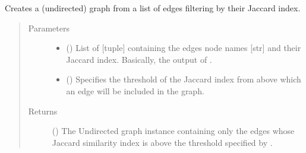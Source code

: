 \documentclass[letterpaper,10pt,english]{sphinxmanual}
\begin{document}
\begin{fulllineitems}
\begin{fulllineitems}
\begin{quote}
\begin{description}
\end{description}\end{quote}

\end{fulllineitems}


\begin{fulllineitems}
\label{\detokenize{reference:pypath.main.PyPath.jaccard_meta}}
Creates a (undirected) graph from a list of edges filtering by
their Jaccard index.
\begin{quote}\begin{description}
\item[{Parameters}] \leavevmode\begin{itemize}
\item {} 
 () \textendash{} List of {[}tuple{]} containing the edges node names {[}str{]} and
their Jaccard index. Basically, the output of
{\hyperref[\detokenize{reference:pypath.main.PyPath.jaccard_edges}]{}}.

\item {} 
 () \textendash{} Specifies the threshold of the Jaccard index from above
which an edge will be included in the graph.

\end{itemize}

\item[{Returns}] \leavevmode
() \textendash{} The Undirected graph instance containing
only the edges whose Jaccard similarity index is above the
threshold specified by .

\end{description}\end{quote}

\end{fulllineitems}


\begin{fulllineitems}
\label{\detokenize{reference:pypath.main.PyPath.kegg_directions}}
\end{fulllineitems}


\end{fulllineitems}
\end{document}
